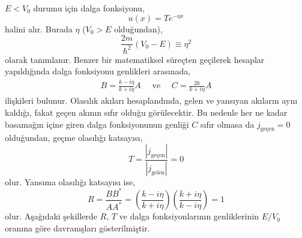 \documentclass[a4paper,12pt, twoside]{article}
\begin{document}
$E<V_0$ durumu için dalga fonksiyonu,
\begin{equation}
u ( x ) = T e ^ { - \eta x }
\end{equation}
halini alır. Burada $\eta$ ($V_0>E$ olduğundan),
\begin{equation}
\frac { 2 m} { \hbar ^ { 2 } }  \left(V _ { 0 } -E \right) \equiv \eta ^ { 2 }
\end{equation}
olarak tanımlanır. Benzer bir matematiksel süreçten geçilerek hesaplar yapıldığında dalga fonksiyonu genlikleri arasınada,
\begin{align}
B =  \frac{k - i \eta}{k + i \eta} A \quad \text{ ve } \quad C =  \frac{2k}{ k+i \eta} A
\end{align}
ilişkileri bulunur. Olasılık akıları hesaplandında, gelen ve yansıyan akıların aynı kaldığı, fakat geçen akının sıfır olduğu görülecektir. Bu nedenle her ne kadar basamağın içine giren dalga fonksiyonunun genliği $C$ sıfır olmasa da $j_\text{geçen} = 0$ olduğundan, geçme olasılığı katsayısı,
\begin{equation}
T = \frac{|j_\text{geçen}|}{|j_\text{gelen}|} = 0
\end{equation}
olur. Yansıma olasılığı katsayısı ise,
\begin{equation}
R = \frac{B B^*}{A A^*} = \left(  \frac{k - i \eta}{k + i \eta} \right) \left( \frac{k + i \eta}{k - i \eta} \right)  = 1
\end{equation}
olur. Aşağıdaki şekillerde $R$, $T$ ve dalga fonksiyonlarının genliklerinin $E/V_0$ oranına göre davranışları gösterilmiştir.
\end{document}
